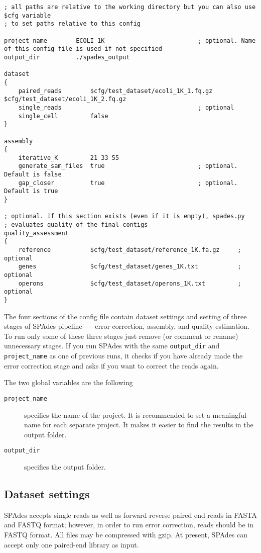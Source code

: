 \documentclass{article}
\def\spades{SPAdes}
\begin{document}

\begin{lstlisting}													
; all paths are relative to the working directory but you can also use $cfg variable 
; to set paths relative to this config

project_name        ECOLI_1K                          ; optional. Name of this config file is used if not specified
output_dir          ./spades_output

dataset
{
    paired_reads        $cfg/test_dataset/ecoli_1K_1.fq.gz $cfg/test_dataset/ecoli_1K_2.fq.gz
    single_reads                                      ; optional
    single_cell         false
}

assembly
{
    iterative_K         21 33 55
    generate_sam_files  true                          ; optional. Default is false
    gap_closer          true                          ; optional. Default is true
}

; optional. If this section exists (even if it is empty), spades.py 
; evaluates quality of the final contigs
quality_assessment      
{
    reference           $cfg/test_dataset/reference_1K.fa.gz     ; optional
    genes               $cfg/test_dataset/genes_1K.txt           ; optional
    operons             $cfg/test_dataset/operons_1K.txt         ; optional
}
\end{lstlisting}

The four sections of the config file contain dataset settings
and setting of three stages of {\spades} pipeline~--- error correction,
assembly, and quality estimation.
To run only some of these three stages just remove (or comment or rename) unnecessary stages.
If you run {\spades} with the same {\tt output\_dir} and {\tt project\_name} as one of previous runs, it checks if you have already made the error correction stage and asks if you want to correct the reads again.

The two global variables are the following
\begin{description}
\item[{\tt project\_name}] specifies the name of the project. It is recommended to set a meaningful name for each separate project.
It makes it easier to find the results in the output folder.
\item[{\tt output\_dir}] specifies the output folder.
\end{description}

\subsection{Dataset settings}
{\spades} accepts single reads as well as forward-reverse paired end reads
in FASTA and FASTQ format; however, in order to run error correction, reads should be in FASTQ format. All files may be compressed with gzip.
At present, {\spades} can accept only one paired-end library as input.
\end{document}

